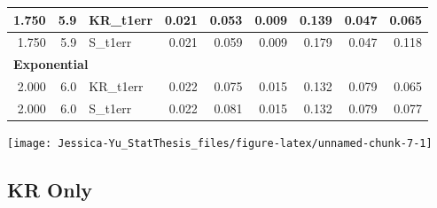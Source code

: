 \documentclass[12pt, twoside]{amherstthesis}
\begin{document}
\begin{landscape}
\begin{tabular}[t]{r|r|l|r|r|r|r|r|r}
\hline
\hspace{1em}1.750 & 5.9 & KR\_t1err & 0.021 & 0.053 & 0.009 & 0.139 & 0.047 & 0.065\\
\hline
\hspace{1em}1.750 & 5.9 & S\_t1err & 0.021 & 0.059 & 0.009 & 0.179 & 0.047 & 0.118\\
\hline
\multicolumn{9}{l}{\textbf{Exponential}}\\
\hline
\hspace{1em}2.000 & 6.0 & KR\_t1err & 0.022 & 0.075 & 0.015 & 0.132 & 0.079 & 0.065\\
\hline
\hspace{1em}2.000 & 6.0 & S\_t1err & 0.022 & 0.081 & 0.015 & 0.132 & 0.079 & 0.077\\
\hline
\end{tabular}
\end{landscape}
\begin{center}\texttt{[image: Jessica-Yu\_StatThesis\_files/figure-latex/unnamed-chunk-7-1]} \end{center}

\hypertarget{kr-only}{%
\subsection{KR Only}\label{kr-only}}
\end{document}
